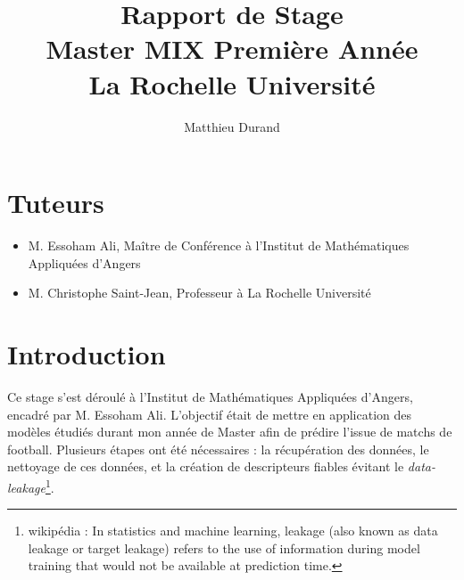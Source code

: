 \documentclass[11pt, a4paper]{report}
\title{Rapport de Stage \\ Master MIX Première Année \\ La Rochelle Université}
\author{Matthieu Durand}
\date{}
\begin{document}
\maketitle
\tableofcontents
\newpage

\section*{Tuteurs}
\begin{itemize}
    \item M. Essoham Ali, Maître de Conférence à l'Institut de Mathématiques Appliquées d'Angers
    \item M. Christophe Saint-Jean, Professeur à La Rochelle Université
\end{itemize}

\section*{Introduction}
Ce stage s'est déroulé à l'Institut de Mathématiques Appliquées d'Angers, 
encadré par M. Essoham Ali. L'objectif était de mettre en application des modèles 
étudiés durant mon année de Master afin de prédire l'issue de matchs de football. 
Plusieurs étapes ont été nécessaires : la récupération des données, le nettoyage 
de ces données, et la création de descripteurs fiables évitant le 
\textit{data-leakage}\footnote{wikipédia : In statistics and machine 
learning, leakage (also known as data leakage or target leakage) refers to the use of 
information during model training that would not be available at prediction time.}.














\newpage
\nocite{*}


\end{document}
